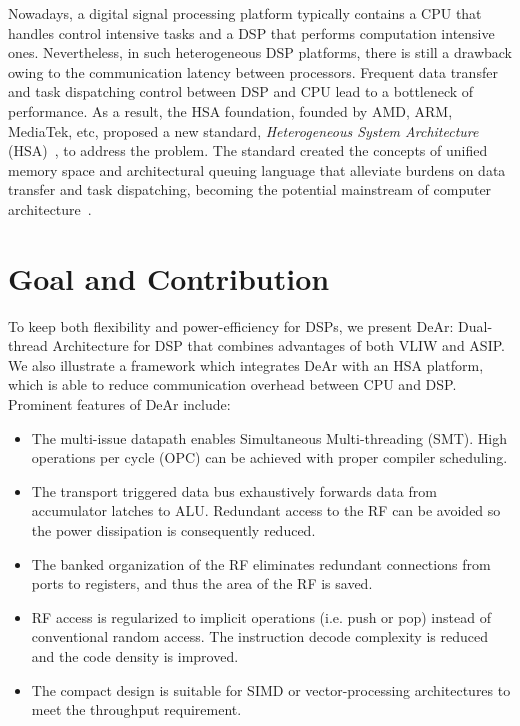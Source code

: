         Nowadays, a digital signal processing platform typically contains a CPU that handles control intensive tasks and a DSP that performs computation intensive ones.
        Nevertheless, in such heterogeneous DSP platforms, there is still a drawback owing to the communication latency between processors. 
        Frequent data transfer and task dispatching control between DSP and CPU lead to a  bottleneck of performance. 
        As a result, the HSA foundation, founded by AMD, ARM, MediaTek, etc, proposed a new standard, \textit{Heterogeneous System Architecture} (HSA)~\cite{systemspec}, to address the problem. 
        The standard created the concepts of unified memory space and architectural queuing language that alleviate burdens on data transfer and task dispatching, becoming the potential mainstream of computer architecture~\cite{mainstream}.
    \section{Goal and Contribution}
        To keep both flexibility and power-efficiency for DSPs, 
        we present DeAr: Dual-thread Architecture for DSP that combines advantages of both VLIW and ASIP.
        We also illustrate a framework which integrates DeAr with an HSA platform, which is able to reduce communication overhead between CPU and DSP. 
        Prominent features of DeAr include:
        \begin{itemize}
            \item The multi-issue datapath enables Simultaneous Multi-threading (SMT). High operations per cycle (OPC) can be achieved with proper compiler scheduling.
            \item The transport triggered data bus exhaustively forwards data from accumulator latches to ALU. Redundant access to the RF can be avoided so the power dissipation is consequently reduced.
            \item The banked organization of the RF eliminates redundant connections from ports to registers, and thus the area of the RF is saved.
            \item RF access is regularized to implicit operations (i.e. push or pop) instead of conventional random access. The instruction decode complexity is reduced and the code density is improved.
            \item The compact design is suitable for SIMD or vector-processing architectures to meet the throughput requirement.
        \end{itemize}
